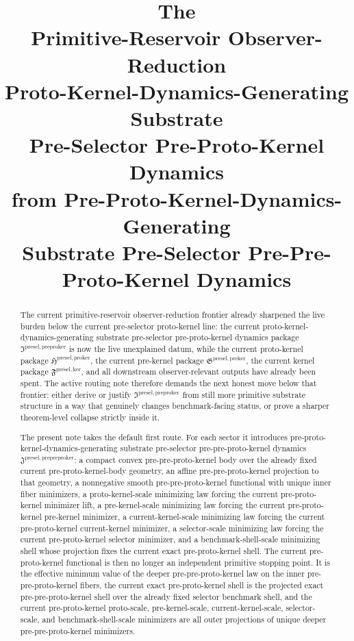 \documentclass[11pt]{article}
\title{\textbf{The \TheoryName{}}\\[0.4em]
\large Primitive-Reservoir Observer-Reduction\\
\large Proto-Kernel-Dynamics-Generating Substrate\\
\large Pre-Selector Pre-Proto-Kernel Dynamics\\
\large from Pre-Proto-Kernel-Dynamics-Generating\\
\large Substrate Pre-Selector Pre-Pre-Proto-Kernel Dynamics}
\author{}
\date{}
\newcommand{\KernelPackage}{\mathfrak F^{\mathrm{presel,ker}}}
\newcommand{\PreKernelPackage}{\mathfrak G^{\mathrm{presel,preker}}}
\newcommand{\ProtoKernelPackage}{\mathfrak H^{\mathrm{presel,proker}}}
\newcommand{\PreProtoKernelPackage}{\mathfrak I^{\mathrm{presel,preproker}}}
\newcommand{\PrePreProtoKernelPackage}{\mathfrak J^{\mathrm{presel,prepreproker}}}
\begin{document}
\maketitle

\begin{abstract}
The current primitive-reservoir observer-reduction frontier already sharpened the live burden below the current pre-selector proto-kernel line: the current proto-kernel-dynamics-generating substrate pre-selector pre-proto-kernel dynamics package \(\PreProtoKernelPackage\) is now the live unexplained datum, while the current proto-kernel package \(\ProtoKernelPackage\), the current pre-kernel package \(\PreKernelPackage\), the current kernel package \(\KernelPackage\), and all downstream observer-relevant outputs have already been spent. The active routing note therefore demands the next honest move below that frontier: either derive or justify \(\PreProtoKernelPackage\) from still more primitive substrate structure in a way that genuinely changes benchmark-facing status, or prove a sharper theorem-level collapse strictly inside it.

The present note takes the default first route. For each sector it introduces pre-proto-kernel-dynamics-generating substrate pre-selector pre-pre-proto-kernel dynamics \(\PrePreProtoKernelPackage\): a compact convex pre-pre-proto-kernel body over the already fixed current pre-proto-kernel-body geometry, an affine pre-pre-proto-kernel projection to that geometry, a nonnegative smooth pre-pre-proto-kernel functional with unique inner fiber minimizers, a proto-kernel-scale minimizing law forcing the current pre-proto-kernel minimizer lift, a pre-kernel-scale minimizing law forcing the current pre-proto-kernel pre-kernel minimizer, a current-kernel-scale minimizing law forcing the current pre-proto-kernel current-kernel minimizer, a selector-scale minimizing law forcing the current pre-proto-kernel selector minimizer, and a benchmark-shell-scale minimizing shell whose projection fixes the current exact pre-proto-kernel shell. The current pre-proto-kernel functional is then no longer an independent primitive stopping point. It is the effective minimum value of the deeper pre-pre-proto-kernel law on the inner pre-pre-proto-kernel fibers, the current exact pre-proto-kernel shell is the projected exact pre-pre-proto-kernel shell over the already fixed selector benchmark shell, and the current pre-proto-kernel proto-scale, pre-kernel-scale, current-kernel-scale, selector-scale, and benchmark-shell-scale minimizers are all outer projections of unique deeper pre-pre-proto-kernel minimizers.


\end{abstract}
\end{document}
